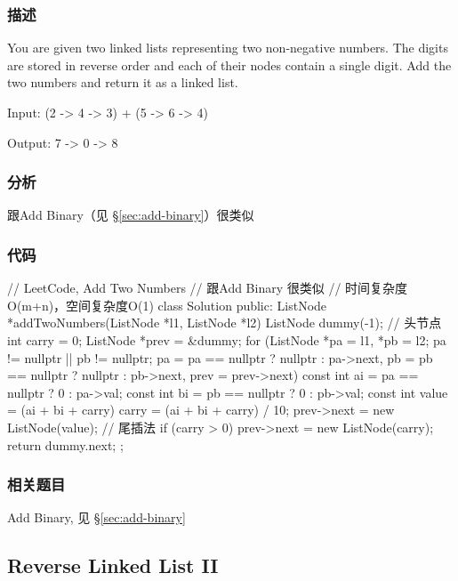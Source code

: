 \subsubsection{描述}
You are given two linked lists representing two non-negative numbers. The digits are stored in reverse order and each of their nodes contain a single digit. Add the two numbers and return it as a linked list.

Input: {\small {} (2 -> 4 -> 3) + (5 -> 6 -> 4)}

Output: {\small {} 7 -> 0 -> 8}


\subsubsection{分析}
跟Add Binary（见 \S \ref{sec:add-binary}）很类似


\subsubsection{代码}
\begin{Code}
// LeetCode, Add Two Numbers
// 跟Add Binary 很类似
// 时间复杂度O(m+n)，空间复杂度O(1)
class Solution {
public:
    ListNode *addTwoNumbers(ListNode *l1, ListNode *l2) {
        ListNode dummy(-1); // 头节点
        int carry = 0;
        ListNode *prev = &dummy;
        for (ListNode *pa = l1, *pb = l2;
             pa != nullptr || pb != nullptr;
             pa = pa == nullptr ? nullptr : pa->next,
             pb = pb == nullptr ? nullptr : pb->next,
             prev = prev->next) {
            const int ai = pa == nullptr ? 0 : pa->val;
            const int bi = pb == nullptr ? 0 : pb->val;
            const int value = (ai + bi + carry) %
            carry = (ai + bi + carry) / 10;
            prev->next = new ListNode(value); // 尾插法
        }
        if (carry > 0)
            prev->next = new ListNode(carry);
        return dummy.next;
    }
};
\end{Code}


\subsubsection{相关题目}

\begindot
\item Add Binary, 见 \S \ref{sec:add-binary}
\myenddot


\subsection{Reverse Linked List II}
\label{sec:reverse-linked-list-ii}


